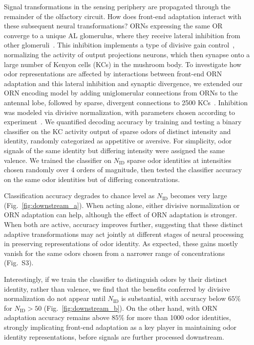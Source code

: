 \documentclass[9pt,twocolumn,twoside]{pnas-new}
\begin{document}
Signal transformations in the sensing periphery are propagated through the remainder of the olfactory circuit. How does front-end adaptation interact with these subsequent neural transformations? ORNs expressing the same OR converge to a unique AL glomerulus, where they receive lateral inhibition from other glomeruli~\cite{lateral_inh, lateral_inh_asahina}. This inhibition implements a type of divisive gain control~\cite{divisive_normalization}, normalizing the activity of output projections neurons, which then synapse onto a large number of Kenyon cells (KCs) in the mushroom body. To investigate how odor representations are affected by interactions between front-end ORN adaptation and this lateral inhibition and synaptic divergence, we extended our ORN encoding model by adding uniglomerular connections from ORNs to the antennal lobe, followed by sparse, divergent connections to 2500 KCs~\cite{memory_review, litwinkumar, abbott_axel}. Inhibition was modeled via divisive normalization, with parameters chosen according to experiment~\cite{divisive_normalization}.
We quantified decoding accuracy by training and testing a binary classifier on the KC activity output of sparse odors of distinct intensity and identity, randomly categorized as appetitive or aversive. For simplicity, odor signals of the same identity but differing intensity were assigned the same valence. We trained the classifier on $N_{{\text {ID}}}$ sparse odor identities at intensities chosen randomly over 4 orders of magnitude, then tested the classifier accuracy on the same odor identities but of differing concentrations. 

Classification accuracy degrades to chance level as $N_{\text {ID}}$ becomes very large (Fig.~\ref{fig:downstream_a}). When acting alone, either divisive normalization or ORN adaptation can help, although the effect of ORN adaptation is stronger. When both are active, accuracy improves further, suggesting that these distinct adaptive transformations may act jointly at different stages of neural processing in preserving representations of odor identity. As expected, these gains mostly vanish for the same odors chosen from a narrower range of concentrations (Fig.~S3).

Interestingly, if we train the classifier to distinguish odors by their distinct identity, rather than valence, we find that the benefits conferred by divisive normalization do not appear until $N_{{\text {ID}}}$ is substantial, with accuracy below $65\%$ for $N_{{\text {ID}}} > 50$ (Fig.~\ref{fig:downstream_b}). On the other hand, with ORN adaptation accuracy remains above $85\%$ for more than 1000 odor identities, strongly implicating front-end adaptation as a key player in maintaining odor identity representations, before signals are further processed downstream. 
\end{document}

